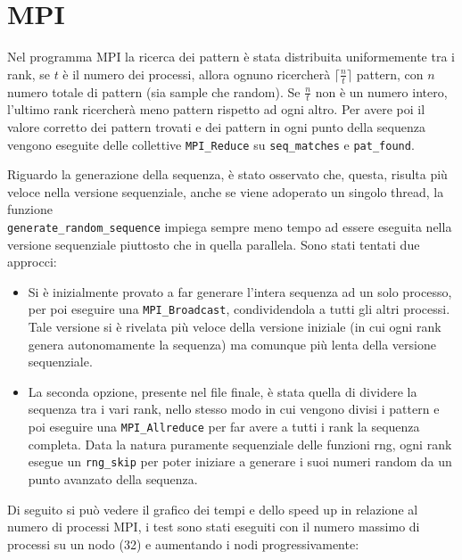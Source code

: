 \documentclass[12pt,openany]{report}
\begin{document}
\newpage
\section{MPI}
Nel programma MPI la ricerca dei pattern è stata distribuita uniformemente tra i rank, se $t$ è il numero dei processi, allora ognuno ricercherà $\lceil \frac{n}{t}\rceil$ pattern, con $n$ numero totale di pattern (sia sample che random). Se $\frac{n}{t}$ non è un numero intero, l'ultimo rank ricercherà meno pattern rispetto ad ogni altro. Per avere poi il valore corretto dei pattern trovati e dei pattern in ogni punto della sequenza vengono eseguite delle collettive \texttt{MPI\_Reduce} su \texttt{seq\_matches} e \texttt{pat\_found}.

\bigskip 
Riguardo la generazione della sequenza,
è stato osservato che, questa, risulta  più veloce nella versione sequenziale, anche se viene adoperato un singolo thread, la funzione\\ \texttt{generate\_random\_sequence} impiega sempre meno tempo ad essere eseguita nella versione sequenziale piuttosto che in quella parallela. Sono stati tentati due approcci:
\begin{itemize}
    \item Si è inizialmente provato a far generare l'intera sequenza ad un solo processo, per poi eseguire una \texttt{MPI\_Broadcast}, condividendola a tutti gli altri processi. Tale versione si è rivelata più veloce della versione iniziale (in cui ogni rank genera autonomamente la sequenza) ma comunque più lenta della versione sequenziale.
    \item La seconda opzione, presente nel file finale, è stata quella di dividere la sequenza tra i vari rank, nello stesso modo in cui vengono divisi i pattern e poi eseguire una \texttt{MPI\_Allreduce} per far avere a tutti i rank la sequenza completa. Data la natura puramente sequenziale delle funzioni rng, ogni rank esegue un \texttt{rng\_skip} per poter iniziare a generare i suoi numeri random da un punto avanzato della sequenza.
\end{itemize}
Di seguito si può vedere il grafico dei tempi e dello speed up in relazione al numero di processi MPI, i test sono stati eseguiti con il numero massimo di processi su un nodo (32) e aumentando i nodi progressivamente:
\end{document}
